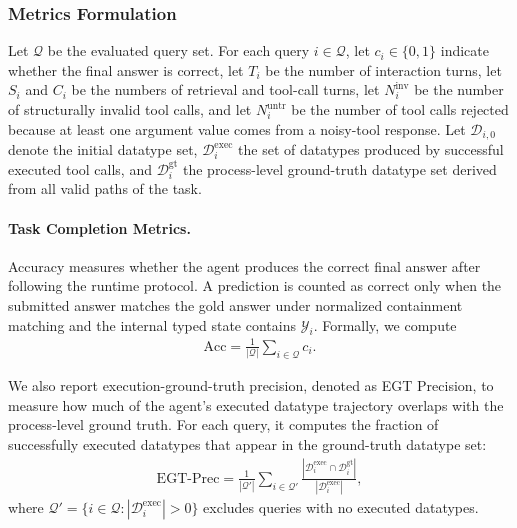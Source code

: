 \subsubsection{Metrics Formulation}
\label{app:full-metric-definition}

Let $\mathcal{Q}$ be the evaluated query set. 
For each query $i \in \mathcal{Q}$, let $c_i \in \{0,1\}$ indicate whether the final answer is correct, let $T_i$ be the number of interaction turns, let $S_i$ and $C_i$ be the numbers of retrieval and tool-call turns, let $N_i^{\mathrm{inv}}$ be the number of structurally invalid tool calls, and let $N_i^{\mathrm{untr}}$ be the number of tool calls rejected because at least one argument value comes from a noisy-tool response.
Let $\mathcal{D}_{i,0}$ denote the initial datatype set, $\mathcal{D}_i^{\mathrm{exec}}$ the set of datatypes produced by successful executed tool calls, and $\mathcal{D}_i^{\mathrm{gt}}$ the process-level ground-truth datatype set derived from all valid paths of the task.

\paragraph{Task Completion Metrics.}
Accuracy measures whether the agent produces the correct final answer after following the runtime protocol. 
A prediction is counted as correct only when the submitted answer matches the gold answer under normalized containment matching and the internal typed state contains $\mathcal{Y}_i$.
Formally, we compute
\begin{equation}
\begin{aligned}
\mathrm{Acc} = \frac{1}{|\mathcal{Q}|}\sum_{i \in \mathcal{Q}} c_i.
\end{aligned}
\end{equation}

We also report execution-ground-truth precision, denoted as EGT Precision, to measure how much of the agent's executed datatype trajectory overlaps with the process-level ground truth. 
For each query, it computes the fraction of successfully executed datatypes that appear in the ground-truth datatype set:
\begin{equation}
\begin{aligned}
\mathrm{EGT\mbox{-}Prec} 
= \frac{1}{|\mathcal{Q}'|}\sum_{i \in \mathcal{Q}'}
\frac{|\mathcal{D}_i^{\mathrm{exec}} \cap \mathcal{D}_i^{\mathrm{gt}}|}
{|\mathcal{D}_i^{\mathrm{exec}}|},
\end{aligned}
\end{equation}
where $\mathcal{Q}'=\{i \in \mathcal{Q}: |\mathcal{D}_i^{\mathrm{exec}}|>0\}$ excludes queries with no executed datatypes.

